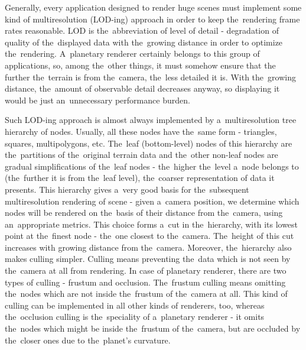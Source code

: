 Generally, every application designed to render huge scenes must implement some kind of multiresolution (LOD-ing) approach in order to keep the~rendering frame rates reasonable. LOD is the~abbreviation of level of detail - degradation of quality of the~displayed data with the~growing distance in order to optimize the~rendering. A~planetary renderer certainly belongs to this group of applications, so, among the~other things, it must somehow ensure that the further the~terrain is from the~camera, the~less detailed it is. With the~growing distance, the~amount of observable detail decreases anyway, so displaying it would be just an~unnecessary performance burden. 

Such LOD-ing approach is almost always implemented by a~multiresolution tree hierarchy of nodes. Usually, all these nodes have the~same form - triangles, squares, multipolygons, etc. The~leaf (bottom-level) nodes of this hierarchy are the~partitions of the~original terrain data and the~other non-leaf nodes are gradual simplifications of the~leaf nodes - the~higher the~level a~node belongs to (the~further it is from the~leaf level), the~coarser representation of data it presents. This hierarchy gives a~very good basis for the~subsequent multiresolution rendering of scene - given a~camera position, we determine which nodes will be rendered on the~basis of their distance from the~camera, using an~appropriate metrics. This choice forms a~cut in the~hierarchy, with its lowest point at the~finest node - the~one closest to the~camera. The~height of this cut increases with growing distance from the~camera. Moreover, the~hierarchy also makes culling simpler. Culling means preventing the~data which is not seen by the~camera at all from rendering. In case of planetary renderer, there are two types of culling - frustum and occlusion. The~frustum culling means omitting the~nodes which are not inside the~frustum of the~camera at all. This kind of culling can be implemented in all other kinds of renderers, too, whereas the~occlusion culling is the~speciality of a~planetary renderer - it omits the~nodes which might be inside the~frustum of the~camera, but are occluded by the~closer ones due to the~planet's curvature. 

